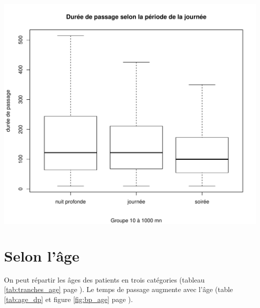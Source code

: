 \documentclass[12pt,english,french,twoside]{book}\usepackage[]{graphicx}\usepackage[]{color}
\makeatletter
\def\maxwidth{ %
  \ifdim\Gin@nat@width>\linewidth
    \linewidth
  \else
    \Gin@nat@width
  \fi
}
\newenvironment{knitrout}{}{} %
\makeatother
\begin{document}
\begin{center}
\begin{knitrout}
\color{fgcolor}
\includegraphics[width=\maxwidth]{figure/periode_4} 

\end{knitrout}

\end{center}



\section{Selon l'âge}

On peut répartir les âges des patients en trois catégories (tableau \ref{tab:tranches_age} page \pageref{tab:tranches_age}). Le temps de passage augmente avec l'âge (table \ref{tab:age_dp} et figure \ref{fig:bp_age} page \pageref{fig:bp_age}).

\end{document}

